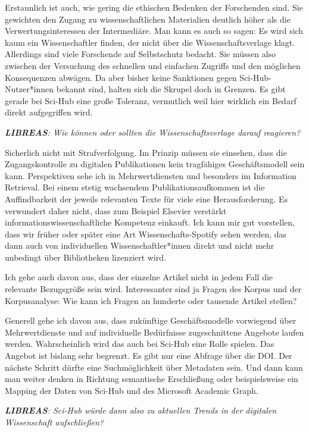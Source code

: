 \documentclass[a4paper,
fontsize=11pt,
oneside,
numbers=noperiodatend,
parskip=half-,
bibliography=totoc,
final
]{scrartcl}
\begin{document}
Erstaunlich ist auch, wie gering die ethischen Bedenken der Forschenden
sind. Sie gewichten den Zugang zu wissenschaftlichen Materialien
deutlich höher als die Verwertungsinteressen der Intermediäre. Man kann
es auch so sagen: Es wird sich kaum ein Wissenschaftler finden, der
nicht über die Wissenschaftsverlage klagt. Allerdings sind viele
Forschende auf Selbstschutz bedacht. Sie müssen also zwischen der
Versuchung des schnellen und einfachen Zugriffs und den möglichen
Konsequenzen abwägen. Da aber bisher keine Sanktionen gegen
Sci-Hub-Nutzer*innen bekannt sind, halten sich die Skrupel doch in
Grenzen. Es gibt gerade bei Sci-Hub eine große Toleranz, vermutlich weil
hier wirklich ein Bedarf direkt aufgegriffen wird.

\emph{\textbf{LIBREAS}: Wie können oder sollten die Wissenschaftsverlage
darauf reagieren?}

Sicherlich nicht mit Strafverfolgung. Im Prinzip müssen sie einsehen,
dass die Zugangskontrolle zu digitalen Publikationen kein tragfähiges
Geschäftsmodell sein kann. Perspektiven sehe ich in Mehrwertdiensten und
besonders im Information Retrieval. Bei einem stetig wachsendem
Publikationsaufkommen ist die Auffindbarkeit der jeweils relevanten
Texte für viele eine Herausforderung. Es verwundert daher nicht, dass
zum Beispiel Elsevier verstärkt informationswissenschaftliche Kompetenz
einkauft. Ich kann mir gut vorstellen, dass wir früher oder später eine
Art Wissenschafts-Spotify sehen werden, das dann auch von individuellen
Wissenschaftler*innen direkt und nicht mehr unbedingt über Bibliotheken
lizenziert wird.

Ich gehe auch davon aus, dass der einzelne Artikel nicht in jedem Fall
die relevante Bezugsgröße sein wird. Interessanter sind ja Fragen des
Korpus und der Korpusanalyse: Wie kann ich Fragen an hunderte oder
tausende Artikel stellen?

Generell gehe ich davon aus, dass zukünftige Geschäftsmodelle vorwiegend
über Mehrwertdienste und auf individuelle Bedürfnisse zugeschnittene
Angebote laufen werden. Wahrscheinlich wird das auch bei Sci-Hub eine
Rolle spielen. Das Angebot ist bislang sehr begrenzt. Es gibt nur eine
Abfrage über die DOI. Der nächste Schritt dürfte eine Suchmöglichkeit
über Metadaten sein. Und dann kann man weiter denken in Richtung
semantische Erschließung oder beispielsweise ein Mapping der Daten von
Sci-Hub und des Microsoft Academic Graph.

\emph{\textbf{LIBREAS}: Sci-Hub würde dann also zu aktuellen Trends in
der digitalen Wissenschaft aufschließen?}
\end{document}
